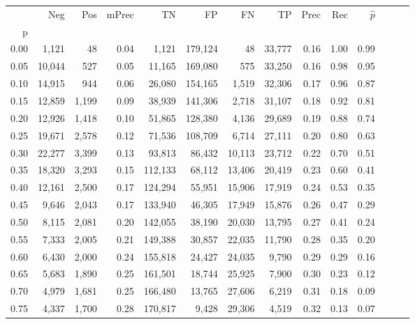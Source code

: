 \begin{tabular}{rrrrrrrrrrrrrr}
\toprule
{} &     Neg &    Pos & mPrec &       TN &       FP &      FN &      TP &  Prec &   Rec & $\hat{p}$ \\
p    &         &        &       &          &          &         &         &       &       &           \\
\midrule
0.00 &   1,121 &     48 &  0.04 &    1,121 &  179,124 &      48 &  33,777 &  0.16 &  1.00 &      0.99 \\
0.05 &  10,044 &    527 &  0.05 &   11,165 &  169,080 &     575 &  33,250 &  0.16 &  0.98 &      0.95 \\
0.10 &  14,915 &    944 &  0.06 &   26,080 &  154,165 &   1,519 &  32,306 &  0.17 &  0.96 &      0.87 \\
0.15 &  12,859 &  1,199 &  0.09 &   38,939 &  141,306 &   2,718 &  31,107 &  0.18 &  0.92 &      0.81 \\
0.20 &  12,926 &  1,418 &  0.10 &   51,865 &  128,380 &   4,136 &  29,689 &  0.19 &  0.88 &      0.74 \\
0.25 &  19,671 &  2,578 &  0.12 &   71,536 &  108,709 &   6,714 &  27,111 &  0.20 &  0.80 &      0.63 \\
0.30 &  22,277 &  3,399 &  0.13 &   93,813 &   86,432 &  10,113 &  23,712 &  0.22 &  0.70 &      0.51 \\
0.35 &  18,320 &  3,293 &  0.15 &  112,133 &   68,112 &  13,406 &  20,419 &  0.23 &  0.60 &      0.41 \\
0.40 &  12,161 &  2,500 &  0.17 &  124,294 &   55,951 &  15,906 &  17,919 &  0.24 &  0.53 &      0.35 \\
0.45 &   9,646 &  2,043 &  0.17 &  133,940 &   46,305 &  17,949 &  15,876 &  0.26 &  0.47 &      0.29 \\
0.50 &   8,115 &  2,081 &  0.20 &  142,055 &   38,190 &  20,030 &  13,795 &  0.27 &  0.41 &      0.24 \\
0.55 &   7,333 &  2,005 &  0.21 &  149,388 &   30,857 &  22,035 &  11,790 &  0.28 &  0.35 &      0.20 \\
0.60 &   6,430 &  2,000 &  0.24 &  155,818 &   24,427 &  24,035 &   9,790 &  0.29 &  0.29 &      0.16 \\
0.65 &   5,683 &  1,890 &  0.25 &  161,501 &   18,744 &  25,925 &   7,900 &  0.30 &  0.23 &      0.12 \\
0.70 &   4,979 &  1,681 &  0.25 &  166,480 &   13,765 &  27,606 &   6,219 &  0.31 &  0.18 &      0.09 \\
0.75 &   4,337 &  1,700 &  0.28 &  170,817 &    9,428 &  29,306 &   4,519 &  0.32 &  0.13 &      0.07 \\

\end{tabular}
